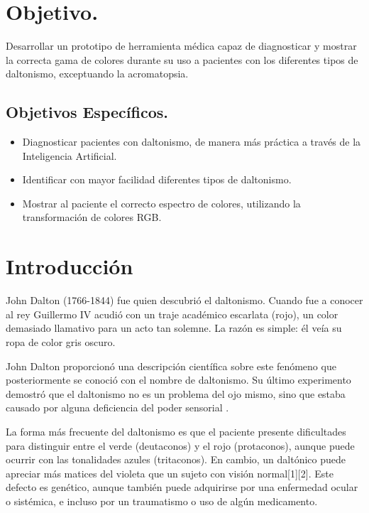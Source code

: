 \documentclass[10pt]{article}
\begin{document}
\section{Objetivo.}

Desarrollar un prototipo de herramienta médica capaz de diagnosticar y mostrar la correcta gama de colores durante su uso  a pacientes con los diferentes tipos de daltonismo, exceptuando la acromatopsia. 

\subsection{Objetivos Específicos.}
\begin{itemize}
\item Diagnosticar pacientes con daltonismo, de manera más práctica a través de la Inteligencia Artificial.
 \item Identificar con mayor facilidad diferentes tipos de daltonismo.
\item Mostrar al paciente el correcto espectro de colores, utilizando la transformación de colores RGB.
\end{itemize}


\newpage

\section{Introducción}
John Dalton (1766-1844) fue quien descubrió el daltonismo. Cuando fue a conocer al rey Guillermo IV acudió con un traje académico escarlata (rojo), un color demasiado llamativo para un acto tan solemne. La razón es simple: él veía su ropa de color gris oscuro.


\setlength{\parskip}{2mm}

John Dalton proporcionó una descripción científica sobre este fenómeno que posteriormente se conoció con el nombre de daltonismo. Su último experimento demostró que el daltonismo no es un problema del ojo mismo, sino que estaba causado por alguna deficiencia del poder sensorial \cite{IEEEreferencias:Ref1}.


\setlength{\parskip}{2mm}

La forma más frecuente del daltonismo es que el paciente presente dificultades para distinguir entre el verde (deutaconos) y el rojo (protaconos), aunque puede ocurrir con las tonalidades azules (tritaconos). En cambio, un daltónico puede apreciar más matices del violeta que un sujeto con visión normal[1][2]. Este defecto es genético, aunque también puede adquirirse por una enfermedad ocular o sistémica, e incluso por un traumatismo o uso de algún medicamento.
\end{document}
